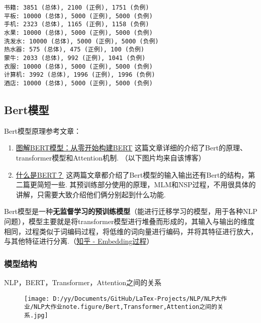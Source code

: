 \documentclass[
]{article}
\begin{document}
\begin{verbatim}
书籍: 3851 (总体), 2100 (正例), 1751 (负例)
平板: 10000 (总体), 5000 (正例), 5000 (负例)
手机: 2323 (总体), 1165 (正例), 1158 (负例)
水果: 10000 (总体), 5000 (正例), 5000 (负例)
洗发水: 10000 (总体), 5000 (正例), 5000 (负例)
热水器: 575 (总体), 475 (正例), 100 (负例)
蒙牛: 2033 (总体), 992 (正例), 1041 (负例)
衣服: 10000 (总体), 5000 (正例), 5000 (负例)
计算机: 3992 (总体), 1996 (正例), 1996 (负例)
酒店: 10000 (总体), 5000 (正例), 5000 (负例)
\end{verbatim}

\hypertarget{bertux6a21ux578b-1}{%
\subsection{Bert模型}\label{bertux6a21ux578b-1}}

Bert模型原理参考文章：

\begin{enumerate}
\def\labelenumi{\arabic{enumi}.}
\item
  \href{https://cloud.tencent.com/developer/article/1389555}{图解BERT模型：从零开始构建BERT}
  这篇文章详细的介绍了Bert的原理、transformer模型和Attention机制.
  （以下图片均来自该博客）
\item
  \href{https://zhuanlan.zhihu.com/p/98855346}{什么是BERT？}
  这两篇文章都介绍了Bert模型的输入输出还有Bert的结构，第二篇更简短一些.
  其预训练部分使用的原理，MLM和NSP过程，不用很具体的讲解，只需要大致介绍他们俩分别起到什么功能.
\end{enumerate}

Bert模型是一种\textbf{无监督学习的预训练模型}（能进行迁移学习的模型，用于各种NLP问题），模型主要就是将transformer模型进行堆叠而形成的，其输入与输出的维度相同，过程类似于词编码过程，将低维的词向量进行编码，并将其特征进行放大，与其他特征进行分离.（\href{https://zhuanlan.zhihu.com/p/164502624}{知乎
- Embedding过程}）

\hypertarget{ux6a21ux578bux7ed3ux6784}{%
\subsubsection{模型结构}\label{ux6a21ux578bux7ed3ux6784}}

NLP，BERT，Transformer，Attention之间的关系

\begin{figure}
\centering
\texttt{[image: D:/yy/Documents/GitHub/LaTex-Projects/NLP/NLP大作业/NLP大作业note.figure/Bert,Transformer,Attention之间的关系.jpg]}
\caption{}
\end{figure}
\end{document}
